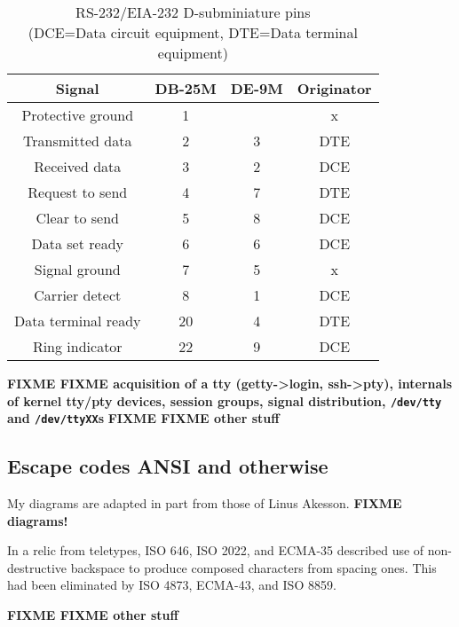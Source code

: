 \begin{table}
  \centering
  \begin{tabular}{ |c|c|c|c| }
    \hline
    Signal & DB-25M & DE-9M & Originator \\
    \hline
    \hline
    Protective ground & 1 & & x \\
    \hline
    Transmitted data & 2 & 3 & DTE \\
    \hline
    Received data & 3 & 2 & DCE \\
    \hline
    Request to send & 4 & 7 & DTE \\
    \hline
    Clear to send & 5 & 8 & DCE \\
    \hline
    Data set ready & 6 & 6 & DCE \\
    \hline
    Signal ground & 7 & 5 & x \\
    \hline
    Carrier detect & 8 & 1 & DCE \\
    \hline
    Data terminal ready & 20 & 4 & DTE \\
    \hline
    Ring indicator & 22 & 9 & DCE \\
    \hline
  \end{tabular}
  \caption[RS-232/EIA-232 pin mappings]{RS-232/EIA-232 D-subminiature pins\\
    (DCE=Data circuit equipment, DTE=Data terminal equipment)}
  \label{table:serial}
\end{table}

\textbf{FIXME FIXME acquisition of a tty (getty->login, ssh->pty),
  internals of kernel tty/pty devices, session groups, signal distribution,
  \texttt{/dev/tty} and \texttt{/dev/ttyXX}s}
\textbf{FIXME FIXME other stuff}
\subsection{Escape codes ANSI and otherwise}
\label{sec:escapes}
My diagrams are adapted in part from those of Linus Akesson\cite{ttydemystified}.
\textbf{FIXME diagrams!}

In a relic from teletypes, ISO 646, ISO 2022, and ECMA-35 described use of
non-destructive backspace to produce composed characters from spacing ones.
This had been eliminated by ISO 4873, ECMA-43, and ISO 8859.

\textbf{FIXME FIXME other stuff}
